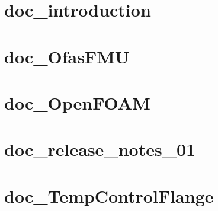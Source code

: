 \documentclass[twoside]{book}
\newcommand{\+}{\discretionary{\mbox{\scriptsize$\hookleftarrow$}}{}{}}
\begin{document}
\chapter{doc\+\_\+introduction}
\label{md__home_carlo_data_GeN-Foam_GeN-Foam_ffn_GeN-Foam_GeN-Foam_FMU4FOAM_docs_pages_doc_doc_introduction}

\chapter{doc\+\_\+\+Ofas\+F\+MU}
\label{md__home_carlo_data_GeN-Foam_GeN-Foam_ffn_GeN-Foam_GeN-Foam_FMU4FOAM_docs_pages_doc_doc_OfasFMU}

\chapter{doc\+\_\+\+Open\+F\+O\+AM}
\label{md__home_carlo_data_GeN-Foam_GeN-Foam_ffn_GeN-Foam_GeN-Foam_FMU4FOAM_docs_pages_doc_doc_OpenFOAM}

\chapter{doc\+\_\+release\+\_\+notes\+\_\+01}
\label{md__home_carlo_data_GeN-Foam_GeN-Foam_ffn_GeN-Foam_GeN-Foam_FMU4FOAM_docs_pages_doc_doc_release_notes_01}

\chapter{doc\+\_\+\+Temp\+Control\+Flange}
\label{md__home_carlo_data_GeN-Foam_GeN-Foam_ffn_GeN-Foam_GeN-Foam_FMU4FOAM_docs_pages_doc_doc_TempControlFlange}

\end{document}

